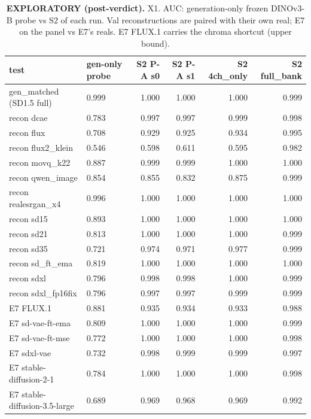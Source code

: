 \begin{table}[htbp]
\centering
\scriptsize
\caption{\textbf{EXPLORATORY (post-verdict).} X1. AUC: generation-only frozen DINOv3-B probe vs S2 of each run. Val reconstructions are paired with their own real; E7 on the panel vs E7's reals. E7 FLUX.1 carries the chroma shortcut (upper bound).}
\label{tab:x1-auc}
\begin{tabular}{llrrrr}
\toprule
test & gen-only probe & S2 P-A s0 & S2 P-A s1 & S2 4ch\_only & S2 full\_bank \\
\midrule
gen\_matched (SD1.5 full) & 0.999 & 1.000 & 1.000 & 1.000 & 0.999 \\
recon dcae & 0.783 & 0.997 & 0.997 & 0.999 & 0.998 \\
recon flux & 0.708 & 0.929 & 0.925 & 0.934 & 0.995 \\
recon flux2\_klein & 0.546 & 0.598 & 0.611 & 0.595 & 0.982 \\
recon movq\_k22 & 0.887 & 0.999 & 0.999 & 1.000 & 1.000 \\
recon qwen\_image & 0.854 & 0.855 & 0.832 & 0.875 & 0.999 \\
recon realesrgan\_x4 & 0.996 & 1.000 & 1.000 & 1.000 & 1.000 \\
recon sd15 & 0.893 & 1.000 & 1.000 & 1.000 & 1.000 \\
recon sd21 & 0.813 & 1.000 & 1.000 & 1.000 & 0.999 \\
recon sd35 & 0.721 & 0.974 & 0.971 & 0.977 & 0.999 \\
recon sd\_ft\_ema & 0.819 & 1.000 & 1.000 & 1.000 & 1.000 \\
recon sdxl & 0.796 & 0.998 & 0.998 & 1.000 & 0.999 \\
recon sdxl\_fp16fix & 0.796 & 0.997 & 0.997 & 0.999 & 0.999 \\
E7 FLUX.1 & 0.881 & 0.935 & 0.934 & 0.933 & 0.988 \\
E7 sd-vae-ft-ema & 0.809 & 1.000 & 1.000 & 1.000 & 0.999 \\
E7 sd-vae-ft-mse & 0.772 & 1.000 & 1.000 & 1.000 & 0.998 \\
E7 sdxl-vae & 0.732 & 0.998 & 0.999 & 0.999 & 0.997 \\
E7 stable-diffusion-2-1 & 0.784 & 1.000 & 1.000 & 1.000 & 0.998 \\
E7 stable-diffusion-3.5-large & 0.689 & 0.969 & 0.968 & 0.969 & 0.992 \\
\bottomrule
\end{tabular}
\end{table}
